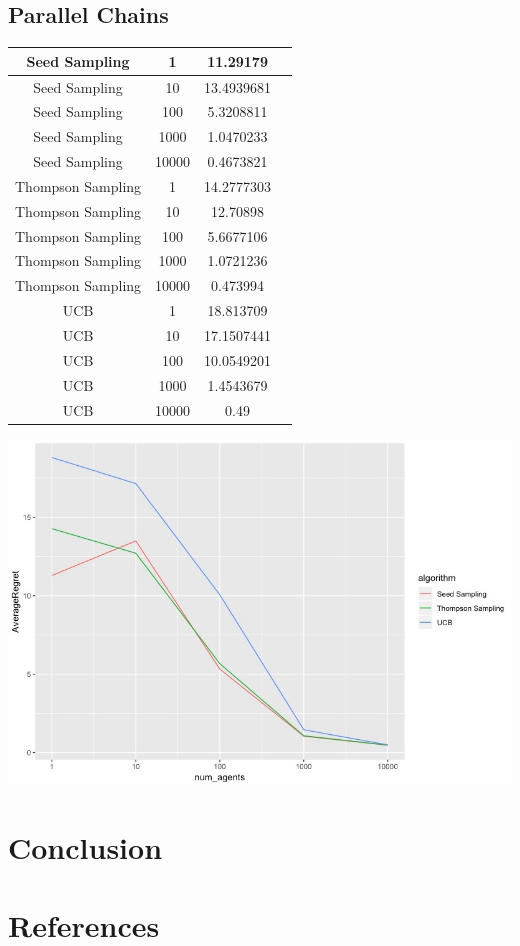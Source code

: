 \documentclass{article}
\begin{document}
\subsection{Parallel Chains}

\begin{table}[]
\begin{tabular}{|c|c|c|c|} 
\hline 
Seed Sampling     & 1       & 11.29179   \\ 
\hline 
Seed Sampling     & 10    & 13.4939681 \\ 
\hline 
Seed Sampling     & 100     & 5.3208811  \\ 
\hline 
Seed Sampling     & 1000   & 1.0470233  \\ 
\hline 
Seed Sampling     & 10000  & 0.4673821  \\ 
\hline 
Thompson Sampling & 1          & 14.2777303 \\ 
\hline 
Thompson Sampling & 10       & 12.70898   \\ 
\hline 
Thompson Sampling & 100    & 5.6677106  \\ 
\hline  
Thompson Sampling & 1000    & 1.0721236  \\ 
\hline 
Thompson Sampling & 10000  & 0.473994   \\ 
\hline 
UCB               & 1         & 18.813709  \\ 
\hline 
UCB               & 10       & 17.1507441 \\ 
\hline 
UCB               & 100      & 10.0549201 \\ 
\hline 
UCB               & 1000    & 1.4543679  \\ 
\hline 
UCB               & 10000  & 0.49      \\ 
\hline 
\end{tabular}
\end{table}
\includegraphics[scale=.3]{pc_results_regret_by_algo.jpg}
\section{Conclusion}

\section{References}



\end{document}
